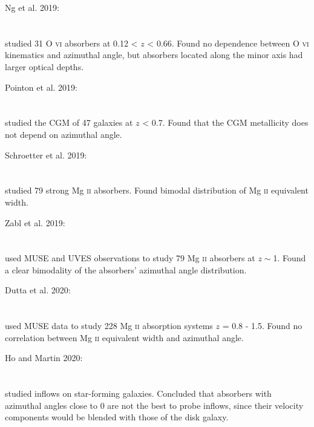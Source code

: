 \hline

Ng et al. 2019: \\
\citet{2019ApJ...886...66N} \\
\citep{2019ApJ...886...66N} \\
studied 31 O \textsc{vi} absorbers at 0.12 < $z$ < 0.66. Found no dependence
between O \textsc{vi} kinematics and azimuthal angle, but absorbers located
along the minor axis had larger optical depths. \\

\hline

Pointon et al. 2019: \\
\citet{2019ApJ...883...78P} \\
\citep{2019ApJ...883...78P} \\
studied the CGM of 47 galaxies at $z$ < 0.7. Found that the CGM metallicity does
not depend on azimuthal angle. \\

\hline

Schroetter et al. 2019: \\
\citet{2019MNRAS.490.4368S} \\
\citep{2019MNRAS.490.4368S} \\
studied 79 strong Mg \textsc{ii} absorbers. Found bimodal distribution of
Mg \textsc{ii} equivalent width. \\

\hline

Zabl et al. 2019: \\
\citet{2019MNRAS.485.1961Z} \\
\citep{2019MNRAS.485.1961Z} \\
used MUSE and UVES observations to study 79 Mg \textsc{ii} absorbers at
$z\sim$1. Found a clear bimodality of the absorbers' azimuthal angle
distribution. \\

\hline

Dutta et al. 2020: \\
\citet{2020MNRAS.499.5022D} \\
\citep{2020MNRAS.499.5022D} \\
used MUSE data to study 228 Mg \textsc{ii} absorption systems $z$ = 0.8 - 1.5.
Found no correlation between Mg \textsc{ii} equivalent width and azimuthal
angle. \\

\hline

Ho and Martin 2020: \\
\citet{2020ApJ...888...14H} \\
\citep{2020ApJ...888...14H} \\
studied inflows on star-forming galaxies. Concluded that absorbers with
azimuthal angles close to 0 are not the best to probe inflows, since their
velocity components would be blended with those of the disk galaxy. \\

